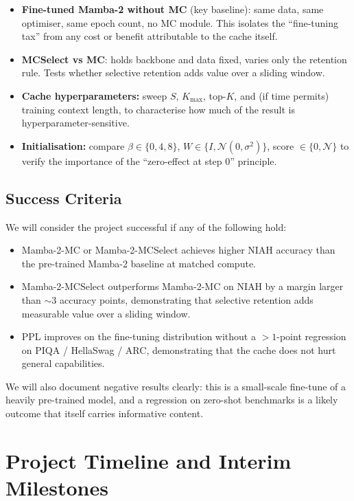 \documentclass[conference]{IEEEtran}
\begin{document}
\begin{itemize}
    \item \textbf{Fine-tuned Mamba-2 without MC} (key baseline): same data, same optimiser, same epoch count, no MC module. This isolates the ``fine-tuning tax'' from any cost or benefit attributable to the cache itself.
    \item \textbf{MCSelect vs MC}: holds backbone and data fixed, varies only the retention rule. Tests whether selective retention adds value over a sliding window.
    \item \textbf{Cache hyperparameters:} sweep $S$, $K_{\max}$, top-$K$, and (if time permits) training context length, to characterise how much of the result is hyperparameter-sensitive.
    \item \textbf{Initialisation:} compare $\beta\in\{0, 4, 8\}$, $W\in\{I, \mathcal{N}(0,\sigma^2)\}$, score $\in\{0, \mathcal{N}\}$ to verify the importance of the ``zero-effect at step 0'' principle.
\end{itemize}

\subsection{Success Criteria}

We will consider the project successful if any of the following hold:

\begin{itemize}
    \item Mamba-2-MC or Mamba-2-MCSelect achieves higher NIAH accuracy than the pre-trained Mamba-2 baseline at matched compute.
    \item Mamba-2-MCSelect outperforms Mamba-2-MC on NIAH by a margin larger than $\sim$3 accuracy points, demonstrating that selective retention adds measurable value over a sliding window.
    \item PPL improves on the fine-tuning distribution without a $>1$-point regression on PIQA / HellaSwag / ARC, demonstrating that the cache does not hurt general capabilities.
\end{itemize}

We will also document negative results clearly: this is a small-scale fine-tune of a heavily pre-trained model, and a regression on zero-shot benchmarks is a likely outcome that itself carries informative content.

\section{Project Timeline and Interim Milestones}
\end{document}
